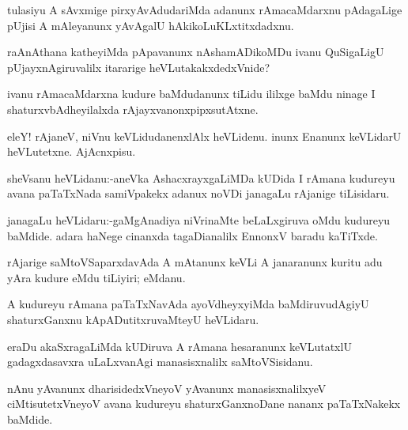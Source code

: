 \documentclass{article}
\begin{document}
\begin{mn}%
tulasiyu A sAvxmige pirxyAvAdudariMda adanunx rAmacaMdarxnu pAdagaLige pUjisi A mAleyanunx 
yAvAgalU hAkikoLuKLxtitxdadxnu.
\end{mn}

\begin{mn}%
raAnAthana katheyiMda pApavanunx nAshamADikoMDu ivanu QuSigaLigU pUjayxnAgiruvalilx itararige
heVLutakakxdedxVnide?
\end{mn}

\begin{mn}%
ivanu rAmacaMdarxna kudure baMdudanunx tiLidu ililxge baMdu ninage I shaturxvbAdheyilalxda 
rAjayxvanonxpipxsutAtxne.
\end{mn}

\begin{mn}%
eleY! rAjaneV, niVnu keVLidudanenxlAlx heVLidenu. inunx Enanunx keVLidarU heVLutetxne. 
AjAcnxpisu.
\end{mn}

\begin{mn}%
sheVsanu heVLidanu:-aneVka AshacxrayxgaLiMDa kUDida I rAmana kudureyu avana paTaTxNada 
samiVpakekx adanux noVDi janagaLu rAjanige tiLisidaru.
\end{mn}

\begin{mn}%
janagaLu heVLidaru:-gaMgAnadiya niVrinaMte beLaLxgiruva oMdu kudureyu baMdide. adara 
haNege cinanxda tagaDianalilx EnnonxV baradu kaTiTxde.
\end{mn}

\begin{mn}%
rAjarige saMtoVSaparxdavAda A mAtanunx keVLi A janaranunx kuritu adu yAra kudure eMdu 
tiLiyiri; eMdanu.
\end{mn}

\begin{mn}%
A kudureyu rAmana paTaTxNavAda ayoVdheyxyiMda baMdiruvudAgiyU shaturxGanxnu 
kApADutitxruvaMteyU heVLidaru.
\end{mn}

\begin{mn}%
eraDu akaSxragaLiMda kUDiruva A rAmana hesaranunx keVLutatxlU gadagxdasavxra uLaLxvanAgi 
manasisxnalilx saMtoVSisidanu.
\end{mn}

\begin{mn}%
nAnu yAvanunx dharisidedxVneyoV yAvanunx manasisxnalilxyeV  ciMtisutetxVneyoV avana 
kudureyu shaturxGanxnoDane nananx paTaTxNakekx baMdide.
\end{mn}
\end{document}
